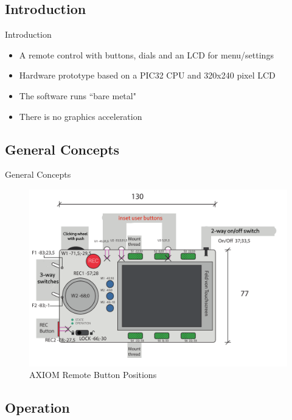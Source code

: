 \documentclass{beamer}
\begin{document}
\subsection{Introduction}

\begin{frame}{Introduction}
	\begin{itemize}
		\item A remote control with buttons, dials and an LCD for menu/settings
		\item Hardware prototype based on a PIC32 CPU and 320x240 pixel LCD
		\item The software runs ``bare metal"
		\item There is no graphics acceleration
	\end{itemize}	

\end{frame}

\subsection{General Concepts}

\begin{frame}{General Concepts}
	\begin{center}
		\begin{figure}[h]
		    \centering
		    \includegraphics[width=0.8\linewidth]{images/axiom_remote_bottonPos.png}
		    \caption{AXIOM Remote Button Positions}
		    \label{fig:logo}
		\end{figure}
	\end{center}
\end{frame}

\subsection{Operation}
\end{document}
